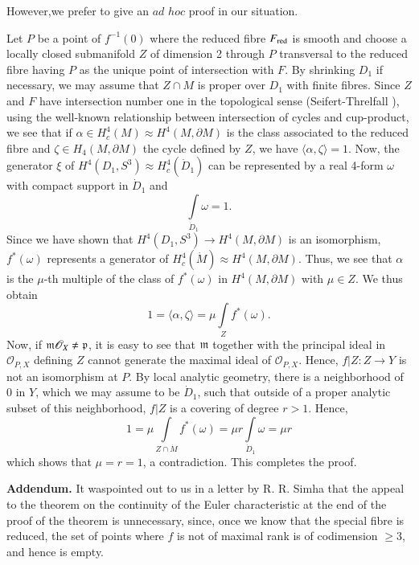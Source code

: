 However,\pageoriginale we prefer to give an $ad $ $hoc$ proof in our situation.

Let $P$ be a point of $f^{-1} (0)$ where the reduced fibre $F_{\operatorname{red}}$ is smooth and choose a locally closed submanifold $Z$ of dimension 2 through $P$ transversal to the reduced fibre having $P$ as the unique point of intersection with $F$. By shrinking $D_1$ if necessary, we may assume that $Z \cap M$ is proper over $D_1$ with finite fibres. Since $Z$ and $F$ have intersection number one in the topological sense (Seifert-Threlfall \cite{art7-key3}), using the well-known relationship between intersection of cycles and cup-product, we see that if $\alpha \in H^4_c (M) \approx H^4 (M, \partial M)$ is the class associated to the reduced fibre and $\zeta \in H_4 (M, \partial M)$ the cycle defined by $Z$, we have $\langle \alpha, \zeta \rangle =1$. Now, the  generator $\xi$ of $H^4 (D_1, S^3) \approx H^4_c (\dot{D}_1)$ can be represented by a real 4-form $\omega$ with compact support in $\dot{D}_1$ and 
$$
\int\limits_{\dot{D}_1} \omega = 1. 
$$
Since we have shown that $H^4 (D_1, S^3) \to H^4 (M, \partial M)$ is an isomorphism, $f^*(\omega)$ represents a generator of $H^4_c (\dot{M}) \approx H^4 (M, \partial M)$. Thus, we see that $\alpha$ is the $\mu$-th multiple of the class of $f^* (\omega)$ in $H^4 (M, \partial M)$ with $\mu \in Z$. We thus obtain
$$
1 = \langle \alpha, \zeta \rangle = \mu \int\limits_{Z} f^*(\omega).
$$
Now, if $\mathfrak{m}\mathscr{O}_X \neq \mathfrak{p}$, it is easy to see that $\mathfrak{m}$ together with the principal ideal in $\mathscr{O}_{P,X}$ defining $Z$ cannot generate the maximal ideal of $\mathscr{O}_{P,X}$. Hence, $f| Z: Z \to Y$ is not an isomorphism at $P$. By local analytic geometry, there is a neighborhood of 0 in $Y$, which we may assume to be $\dot{D}_1$, such that outside of a proper analytic subset of this neighborhood, $f|Z$ is a covering of degree $r >1$. Hence,
$$
1 = \mu \int\limits_{Z \cap \dot{M}} f^* (\omega) = \mu r \int\limits_{\dot{D}_1} \omega = \mu r
$$
which shows that $\mu = r =1$, a contradiction. This completes the proof.

\vskip 0.8cm

\noindent
\textbf{Addendum.} It was\pageoriginale pointed out to us in a letter by R. R. Simha that the appeal to the theorem on the continuity of the Euler characteristic at the end of the proof of the theorem is unnecessary, since, once we know that the special fibre is reduced, the set of points where $f$ is not of maximal rank is of codimension $\geqslant 3$, and hence is empty.

